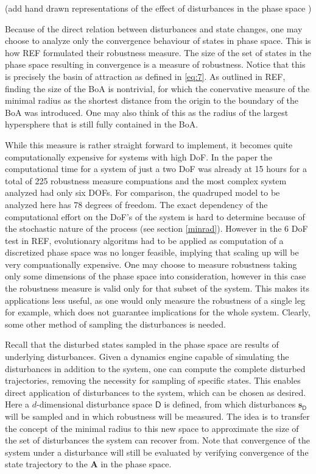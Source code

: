     (add hand drawn representations of the effect of disturbances in the phase space )

    Because of the direct relation between disturbances and state changes, one may choose to analyze only the convergence behaviour of states in phase space. This is how REF formulated their robustness measure. The size of the set of states in the phase space resulting in convergence is a measure of robustness. Notice that this is precisely the basin of attraction as defined in \ref{eq:7}. As outlined in REF, finding the size of the BoA is nontrivial, for which the conervative measure of the minimal radius as the shortest distance from the origin to the boundary of the BoA was introduced. One may also think of this as the radius of the largest hypersphere that is still fully contained in the BoA.

    While this measure is rather straight forward to implement, it becomes quite computationally expensive for systems with high DoF. 
    In the paper the computational time for a system of just a two DoF was already at 15 hours for a total of 225 robustness measure compuations and the most complex system analyzed had only six DOFs. For comparison, the quadruped model to be analyzed here has 78 degrees of freedom. The exact dependency of the computational effort on the DoF's of the system is hard to determine because of the stochastic nature of the process (see section \ref{minrad}). However in the 6 DoF test in REF, evolutionary algoritms had to be applied as computation of a discretized phase space was no longer feasible, implying that scaling up will be very compuationally expensive. One may choose to measure robustness taking only some dimensions of the phase space into consideration, however in this case the robustness measure is valid only for that subset of the system. This makes its applications less useful, as one would only measure the robustness of a single leg for example, which does not guarantee implications for the whole system. Clearly, some other method of sampling the disturbances is needed.

    Recall that the disturbed states sampled in the phase space are results of underlying disturbances. Given a dynamics engine capable of simulating the disturbances in addition to the system, one can compute the complete disturbed trajectories, removing the necessity for sampling of specific states. This enables direct application of disturbances to the system, which can be chosen as desired. Here a $d$-dimensional disturbance space $\mathsf{D}$ is defined, from which disturbances $\mathbf{s}_{\mathsf{D}}$ will be sampled and in which robustness will be measured. The idea is to transfer the concept of the minimal radius to this new space to approximate the size of the set of disturbances the system can recover from. Note that convergence of the system under a disturbance will still be evaluated by verifying convergence of the state trajectory to the $\mathbf{A}$ in the phase space. 

